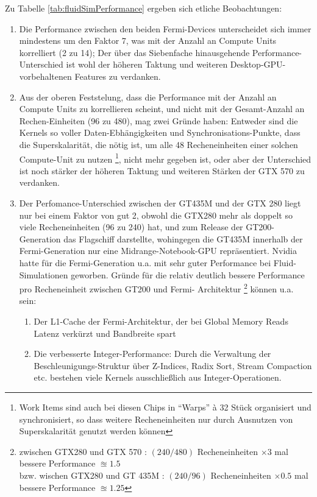 	Zu Tabelle \ref{tab:fluidSimPerformance} ergeben sich etliche Beobachtungen:
	\begin{enumerate}
		\item Die Performance zwischen den beiden Fermi-Devices unterscheidet sich immer mindestens um den Faktor 7,
		was mit der Anzahl an Compute Units korrelliert (2 zu 14); Der über das Siebenfache hinausgehende
		Performance-Unterschied ist wohl der höheren Taktung und weiteren Desktop-GPU- vorbehaltenen Features zu verdanken.
		\item Aus der oberen Feststelung, dass die Performance mit der Anzahl an Compute Units zu korrellieren scheint,
		und nicht mit der Gesamt-Anzahl an Rechen-Einheiten (96 zu 480), mag zwei Gründe haben: Entweder sind die
		Kernels so voller Daten-Ebhängigkeiten und Synchronisations-Punkte, dass die Superskalarität, die nötig ist, um 
		alle 48 Recheneinheiten einer solchen Compute-Unit zu nutzen \footnote{Work Items sind auch bei diesen Chips in 
		"`Warps"' à 32 Stück organisiert und synchronisiert, so dass weitere Recheneinheiten nur durch Ausnutzen von 
		Superskalarität	genutzt werden können}, nicht mehr gegeben ist,
		oder aber der Unterschied ist noch stärker der höheren Taktung und weiteren Stärken der GTX 570 zu verdanken.
		\item Der Perfomance-Unterschied zwischen der GT435M und der GTX 280 liegt nur bei einem Faktor von gut 2,
		obwohl die GTX280 mehr als doppelt so viele Recheneinheiten (96 zu 240) hat, und zum Release der GT200-Generation
		das Flagschiff darstellte, wohingegen die GT435M innerhalb der Fermi-Generation nur eine Midrange-Notebook-GPU
		repräsentiert. Nvidia hatte für die Fermi-Generation u.a. mit sehr guter Performance bei Fluid-Simulationen
		geworben. Gründe für die relativ deutlich bessere Performance pro Recheneinheit zwischen GT200 und Fermi-
		Architektur 
		\footnote{
			zwischen GTX280 und GTX 570 :  
			$(240/480)$ Recheneinheiten $ \times 3 $ mal bessere Performance $ \approxeq 1.5 $ \\
			bzw. wischen GTX280 und GT 435M :  
			$(240/96)$ Recheneinheiten $ \times 0.5 $ mal bessere Performance $ \approxeq 1.25 $
		} können u.a. sein:
		\begin{enumerate}
			\item Der L1-Cache der Fermi-Architektur, der bei Global Memory Reads Latenz verkürzt und Bandbreite spart
			\item Die verbesserte Integer-Performance: Durch die Verwaltung der Beschleunigungs-Struktur über Z-Indices,
			Radix Sort, Stream Compaction etc. bestehen viele Kernels ausschließlich aus Integer-Operationen.

\end{enumerate}
\end{enumerate}

